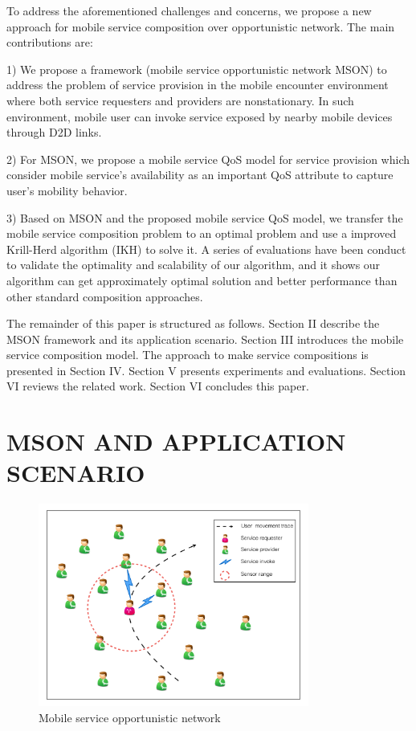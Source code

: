 \documentclass[10pt,journal,compsoc]{IEEEtran}
\begin{document}
To address the aforementioned challenges and concerns, we propose a new approach for mobile service composition over opportunistic network. The main contributions are:

1) We propose a framework (mobile service opportunistic network MSON) to address the problem of service provision in the mobile encounter environment where both service requesters and providers are nonstationary. In such environment, mobile user can invoke service exposed by nearby mobile devices through D2D links.

2) For MSON, we propose a mobile service QoS model for service provision which consider mobile service's availability as an important QoS attribute to capture user's mobility behavior.

3) Based on MSON and the proposed mobile service QoS model, we transfer the mobile service composition problem to an optimal problem and use a improved Krill-Herd algorithm (IKH) to solve it. A series of evaluations have been conduct to validate the optimality and scalability of our algorithm, and it shows our algorithm can get approximately optimal solution and better performance than other standard composition approaches. 

The remainder of this paper is structured as follows. Section II describe the MSON framework and its application scenario. Section III introduces the mobile service composition model. The approach to make service compositions is presented in Section IV. Section V presents experiments and evaluations. Section VI reviews the related work. Section VI concludes this paper.

\section{MSON AND APPLICATION SCENARIO}

\begin{figure}[!t]
\centering
\includegraphics[width=3.5in]{./img/pic2.pdf}
\caption{Mobile service opportunistic network}
\label{fig_mson}
\end{figure}
\end{document}
